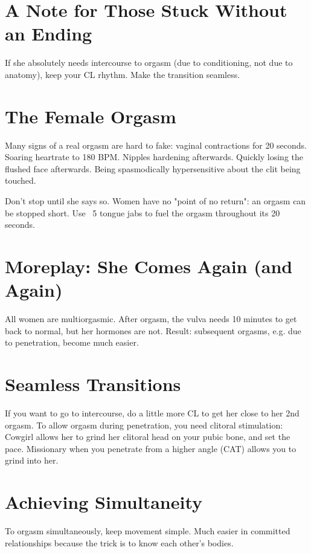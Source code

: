 \section{A Note for Those Stuck Without an Ending}
\begin{outline}
\1 If she absolutely needs intercourse to orgasm (due to conditioning, not due to anatomy), keep your CL rhythm. Make the transition seamless.
\end{outline}

\section{The Female Orgasm}
\begin{outline}
\1 Many signs of a real orgasm are hard to fake:
	 vaginal contractions for 20 seconds.
	\2 Soaring heartrate to 180 BPM.
	\2 Nipples hardening afterwards.
	\2 Quickly losing the flushed face afterwards.
	\2 Being spasmodically hypersensitive about the clit being touched.

\1 Don't stop until she says so.
	\2 Women have no "point of no return": an orgasm can be stopped short.
	\2 Use ~5 tongue jabs to fuel the orgasm throughout its 20 seconds.
\end{outline}

\section{Moreplay: She Comes Again (and Again)}
\begin{outline}
\1 All women are multiorgasmic.
\1 After orgasm, the vulva needs 10 minutes to get back to normal, but her hormones are not. Result: subsequent orgasms, e.g. due to penetration, become much easier.
\end{outline}

\section{Seamless Transitions}
\begin{outline}
\1 If you want to go to intercourse, do a little more CL to get her close to her 2nd orgasm.
\1 To allow orgasm during penetration, you need clitoral stimulation:
	\2 Cowgirl allows her to grind her clitoral head on your pubic bone, and set the pace.
	\2 Missionary when you penetrate from a higher angle (CAT) allows you to grind into her.
\end{outline}

\section{Achieving Simultaneity}
\begin{outline}
\1 To orgasm simultaneously, keep movement simple.
\1 Much easier in committed relationships because the trick is to know each other's bodies.
\end{outline}

